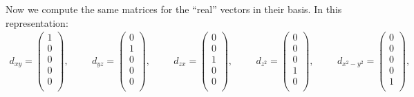 \documentclass[10pt]{article} %
\begin{document}
Now we compute the same matrices for the ``real'' vectors in their basis. In this representation:
\begin{align*}
  d_{xy} =
  \begin{pmatrix}
    1\\
    0\\
    0\\
    0\\
    0\\
  \end{pmatrix},
  \hspace{1cm}
  d_{yz} =
  \begin{pmatrix}
    0\\
    1\\
    0\\
    0\\
    0\\
  \end{pmatrix},
  \hspace{1cm}
  d_{zx} =
  \begin{pmatrix}
    0\\
    0\\
    1\\
    0\\
    0\\
  \end{pmatrix},
  \hspace{1cm}
  d_{z^2} =
  \begin{pmatrix}
    0\\
    0\\
    0\\
    1\\
    0\\
  \end{pmatrix},
  \hspace{1cm}
  d_{x^2-y^2} =
  \begin{pmatrix}
    0\\
    0\\
    0\\
    0\\
    1\\
  \end{pmatrix},
  \hspace{1cm}
\end{align*}
\end{document}
